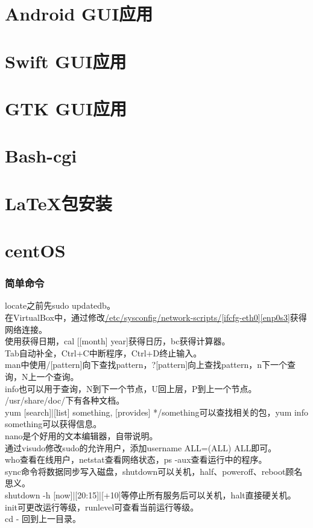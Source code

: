 \documentclass{ctexart}
\begin{document}
\section{Android GUI应用}
\section{Swift GUI应用}
\section{GTK GUI应用}
\section{Bash-cgi}
\section{LaTeX包安装}
\section{centOS}
\subsubsection*{简单命令}
\noindent locate之前先sudo updatedb。\\
\noindent 在VirtualBox中，通过修改\href{https://unix.stackexchange.com/questions/79269/out-of-the-box-centos-in-virtualbox-nat-network-is-unreachable}{/etc/sysconfig/network-scripts/[ifcfg-eth0][enp0s3]}获得网络连接。\\
\noindent 使用获得日期，cal [[month] year]获得日历，bc获得计算器。\\
\noindent Tab自动补全，Ctrl+C中断程序，Ctrl+D终止输入。\\
\noindent man中使用/[pattern]向下查找pattern，?[pattern]向上查找pattern，n下一个查询，N上一个查询。\\
\noindent info也可以用于查询，N到下一个节点，U回上层，P到上一个节点。\\
\noindent /usr/share/doc/下有各种文档。\\
\noindent yum [search]|[list] something, [provides] */something可以查找相关的包，yum info something可以获得信息。\\
\noindent nano是个好用的文本编辑器，自带说明。\\
\noindent 通过visudo修改sudo的允许用户，添加username ALL=(ALL) ALL即可。\\
\noindent who查看在线用户，netstat查看网络状态，ps -aux查看运行中的程序。\\
\noindent sync命令将数据同步写入磁盘，shutdown可以关机，half、poweroff、reboot顾名思义。\\
\noindent shutdown -h [now]|[20:15]|[+10]等停止所有服务后可以关机，halt直接硬关机。\\
\noindent init可更改运行等级，runlevel可查看当前运行等级。\\
\noindent cd - 回到上一目录。
\end{document}

